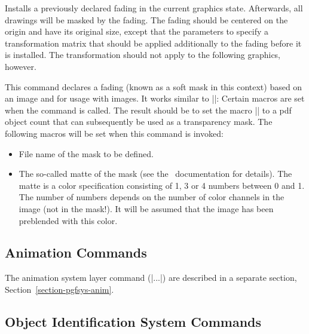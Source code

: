 \begin{command}{\pgfsys@usefading{}}
  Installs a previously declared fading  in the current
  graphics state. Afterwards, all drawings will be masked by the
  fading. The fading should be centered on the origin and have its
  original size, except that the parameters  to 
  specify a transformation matrix that should be applied additionally
  to the fading before it is installed. The transformation should not
  apply to the following graphics, however.
\end{command}


\begin{command}{\pgfsys@definemask}
  This command declares a fading (known as a soft mask in this
  context) based on an image and for usage with images. It
  works similar to |\pgfsys@defineimage|: Certain macros are set when
  the command is called. The result should be to set the macro
  |\pgf@mask| to a pdf object count that can subsequently be used as a
  transparency mask. The following macros will be set when this command is
  invoked:

  \begin{itemize}
  \item \declare{|\pgf@filename|}
    File name of the mask to be defined.

  \item \declare{|\pgf@maskmatte|}
    The so-called matte of the mask (see the \pdf\ documentation for
    details). The matte is a color specification consisting of 1, 3 or
    4 numbers between 0 and 1. The number of numbers depends on the
    number of color channels in the image (not in the mask!). It will
    be assumed that the image has been preblended with this color.
  \end{itemize}
\end{command}


\subsection{Animation Commands}

The animation system layer command (|\pgfsys@anim...|) are described
in a separate section, Section~\ref{section-pgfsys-anim}.



\subsection{Object Identification System Commands}
\label{section-sys-id}

